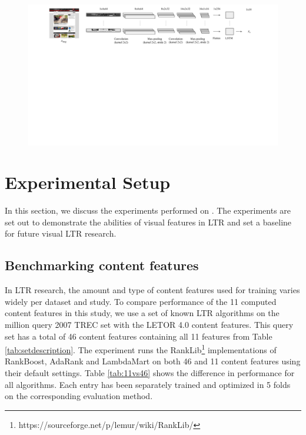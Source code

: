\begin{figure}[t]
\centering
\includegraphics[clip,trim=0 10cm 0 0, width=20cm]{images/vip-features.pdf}
   \label{fig:ViPfeat} 
\end{figure}

\section{Experimental Setup}\label{sec:experiments}
In this section, we discuss the experiments performed on \datasetname. The experiments are set out to demonstrate the abilities of visual features in LTR and set a baseline for future visual LTR research.


\subsection{Benchmarking content features}
In LTR research, the amount and type of content features used for training varies widely per dataset and study. To compare performance of the 11 computed content features in this study, we use a set of known LTR algorithms on the million query 2007 TREC set with the LETOR 4.0 content features. This query set has a total of 46 content features containing all 11 features from Table \ref{tab:setdescription}. The experiment runs the RankLib\footnote{https://sourceforge.net/p/lemur/wiki/RankLib/} implementations of RankBoost, AdaRank and LambdaMart on both 46 and 11 content features using their default settings. Table \ref{tab:11vs46} shows the difference in performance for all algorithms. Each entry has been separately trained and optimized in 5 folds on the corresponding evaluation method. 

